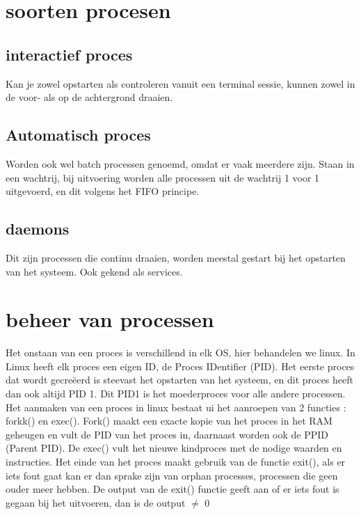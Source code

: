 \documentclass{report}
\begin{document}
		\section{soorten procesen}
			\subsection{interactief proces}
				Kan je zowel opstarten als controleren vanuit een terminal sessie, kunnen zowel in de voor- als op de achtergrond draaien. 
			\subsection{Automatisch proces}
				Worden ook wel batch processen genoemd, omdat er vaak meerdere zijn. Staan in een wachtrij, bij uitvoering worden alle processen uit de wachtrij 1 voor 1 uitgevoerd, en dit volgens het FIFO principe. 
			\subsection{daemons}
				Dit zijn processen die continu draaien, worden meestal gestart bij het opstarten van het systeem. Ook gekend als services.
		\section{beheer van processen}
			Het onstaan van een proces is verschillend in elk OS, hier behandelen we linux. In Linux heeft elk proces een eigen ID, de Proces IDentifier (PID). Het eerste proces dat wordt gecreëerd is steevast het opstarten van het systeem, en dit proces heeft dan ook altijd PID 1. Dit PID1 is het moederproces voor alle andere processen. Het aanmaken van een proces in linux bestaat ui het aanroepen van 2 functies : forkk() en exec(). Fork() maakt een exacte kopie van het proces in het RAM geheugen en vult de PID van het proces in, daarnaast worden ook de PPID (Parent PID). De exec() vult het nieuwe kindproces met de nodige waarden en instructies. Het einde van het proces maakt gebruik van de functie exit(), als er iets fout gaat kan er dan sprake zijn van orphan processes, processen die geen ouder meer hebben. De output van de exit() functie geeft aan of er iets fout is gegaan bij het uitvoeren, dan is de output \(\neq\) 0
			\pagebreak
\end{document}

